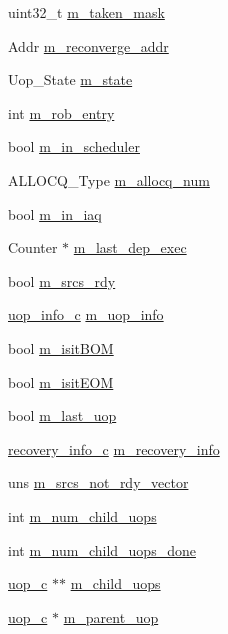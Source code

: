 \begin{DoxyCompactItemize}
\item 
uint32\_\-t \hyperlink{classuop__c_a09c150848bd478757885a3cdaad467f4}{m\_\-taken\_\-mask}
\item 
Addr \hyperlink{classuop__c_a1b4ca5b212004b9b759366edf1f5230d}{m\_\-reconverge\_\-addr}
\item 
Uop\_\-State \hyperlink{classuop__c_a5a06fb116a11e460c6e4fe8911ea313e}{m\_\-state}
\item 
int \hyperlink{classuop__c_aa13e7e0e95d53edfca66b5c487412039}{m\_\-rob\_\-entry}
\item 
bool \hyperlink{classuop__c_a1e781ac8a3b7a97b32051cd56cd6ff3c}{m\_\-in\_\-scheduler}
\item 
ALLOCQ\_\-Type \hyperlink{classuop__c_a26f48f0600b751f4cafb812ca59acb23}{m\_\-allocq\_\-num}
\item 
bool \hyperlink{classuop__c_a4eac12f7b9397fe87befa0c280ba7a68}{m\_\-in\_\-iaq}
\item 
Counter $\ast$ \hyperlink{classuop__c_a5c31eaec3d0421844ae67c8117e2e12d}{m\_\-last\_\-dep\_\-exec}
\item 
bool \hyperlink{classuop__c_a17902cc0c1b6822c2b2ae90c1dfb68d8}{m\_\-srcs\_\-rdy}
\item 
\hyperlink{classuop__info__c}{uop\_\-info\_\-c} \hyperlink{classuop__c_a0c3d8af431bbce5095bb0c2c7bddfb99}{m\_\-uop\_\-info}
\item 
bool \hyperlink{classuop__c_a83a4be636c94d1cd0374d4d6c6cc6b73}{m\_\-isitBOM}
\item 
bool \hyperlink{classuop__c_af5a101ca6b34915c03d169aec29f74ee}{m\_\-isitEOM}
\item 
bool \hyperlink{classuop__c_a5b1259492da4298ae3db51c888a31659}{m\_\-last\_\-uop}
\item 
\hyperlink{classrecovery__info__c}{recovery\_\-info\_\-c} \hyperlink{classuop__c_a5e089783cc7382e60170bb49e412f6c8}{m\_\-recovery\_\-info}
\item 
uns \hyperlink{classuop__c_af479f3e40620da2d36d3e03bd3c6c54e}{m\_\-srcs\_\-not\_\-rdy\_\-vector}
\item 
int \hyperlink{classuop__c_aa6cfd5b37d0d6f865ed2e8fe795774f4}{m\_\-num\_\-child\_\-uops}
\item 
int \hyperlink{classuop__c_a788ae8beb7aa64f5192d8b58368fdb72}{m\_\-num\_\-child\_\-uops\_\-done}
\item 
\hyperlink{classuop__c}{uop\_\-c} $\ast$$\ast$ \hyperlink{classuop__c_a2a5840c5dcfcb176ce0bd09c1e5c1e6b}{m\_\-child\_\-uops}
\item 
\hyperlink{classuop__c}{uop\_\-c} $\ast$ \hyperlink{classuop__c_aa6452c76b89dca70a65638d11c7da8d7}{m\_\-parent\_\-uop}
$$
\end{DoxyCompactItemize}
